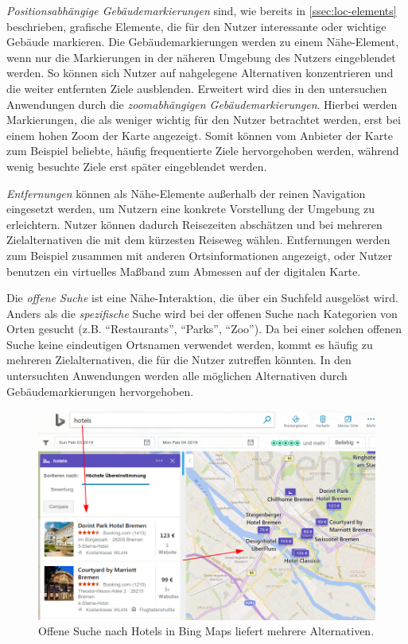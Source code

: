 \emph{Positionsabhängige Gebäudemarkierungen} sind, wie bereits in \autoref{ssec:loc-elements} beschrieben, grafische Elemente, die für den Nutzer interessante oder wichtige Gebäude markieren.
Die Gebäudemarkierungen werden zu einem Nähe-Element, wenn nur die Markierungen in der näheren Umgebung des Nutzers eingeblendet werden.
So können sich Nutzer auf nahgelegene Alternativen konzentrieren und die weiter entfernten Ziele ausblenden.
Erweitert wird dies in den untersuchen Anwendungen durch die \emph{zoomabhängigen Gebäudemarkierungen}.
Hierbei werden Markierungen, die als weniger wichtig für den Nutzer betrachtet werden, erst bei einem hohen Zoom der Karte angezeigt.
Somit können vom Anbieter der Karte zum Beispiel beliebte, häufig frequentierte Ziele hervorgehoben werden, während wenig besuchte Ziele erst später eingeblendet werden.

\emph{Entfernungen} können als Nähe-Elemente außerhalb der reinen Navigation eingesetzt werden, um Nutzern eine konkrete Vorstellung der Umgebung zu erleichtern.
Nutzer können dadurch Reisezeiten abschätzen und bei mehreren Zielalternativen die mit dem kürzesten Reiseweg wählen.
Entfernungen werden zum Beispiel zusammen mit anderen Ortsinformationen angezeigt, oder Nutzer benutzen ein virtuelles Maßband zum Abmessen auf der digitalen Karte.

Die \emph{offene Suche} ist eine Nähe-Interaktion, die über ein Suchfeld ausgelöst wird.
Anders als die \emph{spezifische} Suche wird bei der offenen Suche nach Kategorien von Orten gesucht (z.B. \enquote{Restaurants}, \enquote{Parks}, \enquote{Zoo}).
Da bei einer solchen offenen Suche keine eindeutigen Ortsnamen verwendet werden, kommt es häufig zu mehreren Zielalternativen, die für die Nutzer zutreffen könnten.
In den untersuchten Anwendungen werden alle möglichen Alternativen durch Gebäudemarkierungen hervorgehoben.
\begin{figure}
	\includegraphics[width=\linewidth]{figures/map-app_examples/bm_open_search_2}
	\caption{Offene Suche nach Hotels in Bing Maps liefert mehrere Alternativen.}
	\label{fig:bm_open_search}
\end{figure}

